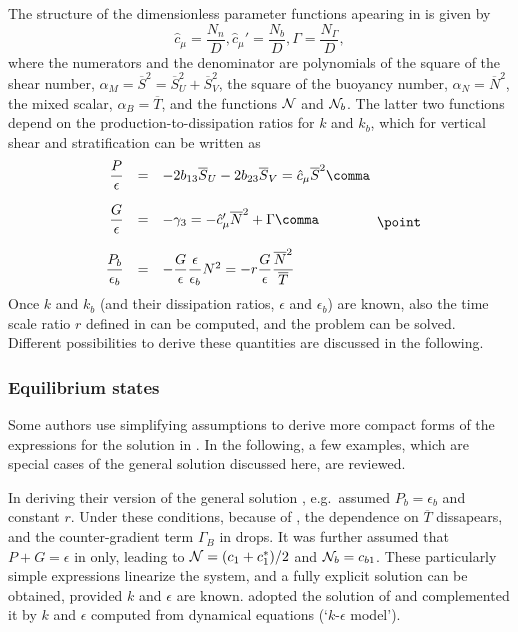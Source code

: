 The structure of the dimensionless parameter functions apearing in
 is given by
\begin{equation}
\label{cm}
  \hat{c}_\mu  = \dfrac{N_n}{D} \comma
  \hat{c}_\mu' = \dfrac{N_b}{D} \comma  
  \Gamma = \dfrac{N_\Gamma}{D}
  \comma
\end{equation}
where the numerators and the denominator are polynomials of the square
of the shear number, $\alpha_M = \overline{S}^2 = \overline{S}^2_U
+\overline{S}^2_V$, the square of the buoyancy number, $\alpha_N =
\overline{N}^2 $, the mixed scalar, $\alpha_B = \overline{T}$, and the
functions ${\cal N}$ and ${\cal N}_b$. The latter two functions depend
on the production-to-dissipation ratios for $k$ and $k_b$, which for
vertical shear and stratification can be written as
\begin{equation}
  \label{PeVertical}
 \begin{array}{rcl}
  \dfrac{P}{\epsilon}     &=& - 2 b_{13} \overline{S}_U - 2 b_{23} \overline{S}_V
                          = \hat{c}_\mu \overline{S}^2 
   \comma \\[5mm]
  \dfrac{G}{\epsilon}     &=&  - \gamma_3  = - \hat{c}_\mu' \overline{N}^2 + \Gamma 
   \comma \\[5mm]
  \dfrac{P_b}{\epsilon_b} &=&  -\dfrac{G}{\epsilon} \dfrac{\epsilon}{\epsilon_b} N^2 
                           =   - r \dfrac{G}{\epsilon} \dfrac{\overline{N}^2}{\overline{T}}
  \end{array}
  \point
\end{equation}
Once $k$ and $k_b$ (and their dissipation ratios, $\epsilon$ and $\epsilon_b$)
are known, also the time scale ratio $r$ defined in  can be computed, 
and the problem can be solved. Different possibilities to derive
these quantities are discussed in the following.


\subsubsection{Equilibrium states}

Some authors use simplifying assumptions to derive more compact forms
of the expressions for the solution in . In the following, a
few examples, which are special cases of the general solution
discussed here, are reviewed.

In deriving their version of the general solution ,
\cite{Canutoetal2001a} e.g.\ assumed $P_b=\epsilon_b$ and constant
$r$. Under these conditions, because of , the
dependence on $\overline{T}$ dissapears, and the counter-gradient term
$\Gamma_B$ in  drops. It was further assumed that
$P+G=\epsilon$ in  only, leading to ${\cal N} = (c_1 + c_1^*)/2$
and ${\cal N}_b=c_{b1}$. These particularly simple expressions
linearize the system, and a fully explicit solution can be obtained, provided
$k$ and $\epsilon$ are known. \cite{BurchardBolding2001}
adopted the solution of \cite{Canutoetal2001a} and complemented it by
$k$ and $\epsilon$ computed from dynamical equations (`$k$-$\epsilon$
model'). 


